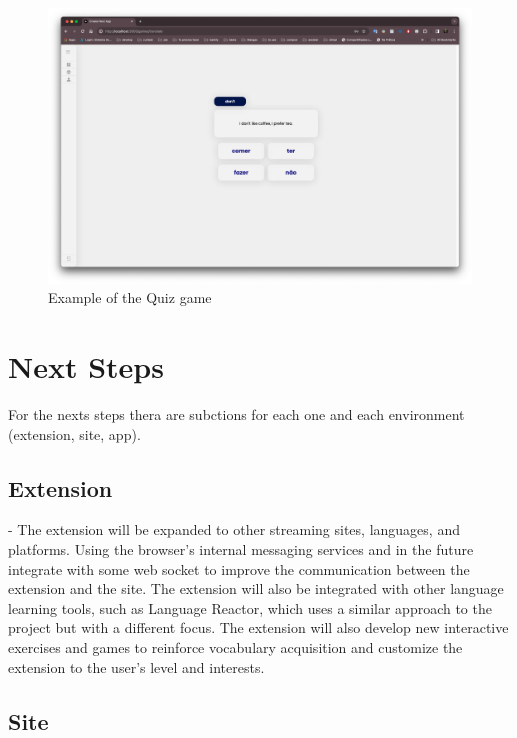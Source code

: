 \documentclass[12pt]{article}
\begin{document}
    \begin{figure}
      \centering
      \caption{
      Example of the Quiz game 
      }
      \label{fig:site8}
      \includegraphics[width=1\textwidth]{assets/8.png}
    \end{figure}





\section{Next Steps}

For the nexts steps thera are subctions for each one and each environment (extension, site, app).

\subsection{Extension}

- The extension will be expanded to other streaming sites, languages, and platforms. Using the browser's internal messaging services and in the future integrate with some web socket to improve the communication between the extension and the site. The extension will also be integrated with other language learning tools, such as Language Reactor, which uses a similar approach to the project but with a different focus. The extension will also develop new interactive exercises and games to reinforce vocabulary acquisition and customize the extension to the user's level and interests.

\subsection{Site}
\end{document}
